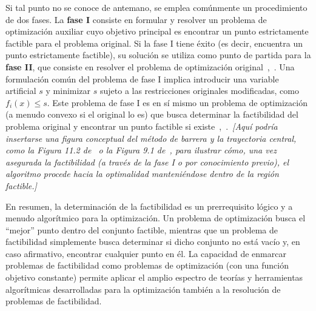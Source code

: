 Si tal punto no se conoce de antemano, se emplea comúnmente un procedimiento de dos fases. La \textbf{fase I} consiste
en formular y resolver un problema de optimización auxiliar cuyo objetivo principal es encontrar un punto estrictamente
factible para el problema original. Si la fase I tiene éxito (es decir, encuentra un punto estrictamente factible), su
solución se utiliza como punto de partida para la \textbf{fase II}, que consiste en resolver el problema de optimización
original~\cite[p.~579]{BoydVandenberghe2004},~\cite[p.~372]{BoydVandenbergheSlides2023}. Una formulación común del
problema de fase I implica introducir una variable artificial $s$ y minimizar $s$ sujeto a las restricciones originales
modificadas, como $f_i(x) \leq s$. Este problema de fase I es en sí mismo un problema de optimización (a menudo convexo
si el original lo es) que busca determinar la factibilidad del problema original y encontrar un punto factible si existe~\cite[p.~579]{BoydVandenberghe2004},~\cite[p.~373]{BoydVandenbergheSlides2023}.\ \textit{[Aquí podría insertarse una
figura conceptual del método de barrera y la trayectoria central, como la Figura 11.2 de~\cite[p.~565]{BoydVandenberghe2004}
o la Figura 9.1 de~\cite[p.~361]{BoydVandenbergheSlides2023}, para ilustrar cómo, una vez asegurada la factibilidad
(a través de la fase I o por conocimiento previo), el algoritmo procede hacia la optimalidad manteniéndose dentro de la
región factible.]}

En resumen, la determinación de la factibilidad es un prerrequisito lógico y a menudo algorítmico para la optimización.
Un problema de optimización busca el ``mejor'' punto dentro del conjunto factible, mientras que un problema de factibilidad
simplemente busca determinar si dicho conjunto no está vacío y, en caso afirmativo, encontrar cualquier punto en él.
La capacidad de enmarcar problemas de factibilidad como problemas de optimización (con una función objetivo constante)
permite aplicar el amplio espectro de teorías y herramientas algorítmicas desarrolladas para la optimización también a la
resolución de problemas de factibilidad.